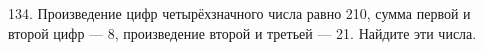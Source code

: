 134. Произведение цифр четырёхзначного числа равно 210, сумма первой и второй цифр --- 8, произведение второй и третьей --- 21. Найдите эти числа.\\
